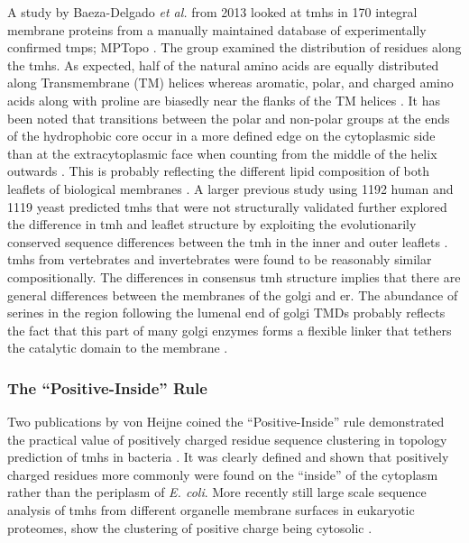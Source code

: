 A study by Baeza-Delgado {\it et al.} from 2013 \cite{Baeza-Delgado2013} looked at \gls{tmh}s in 170 integral membrane proteins from a manually maintained database of experimentally confirmed \gls{tmp}s; MPTopo \cite{Jayasinghe2001}. The group examined the distribution of residues along the \gls{tmh}s. As expected, half of the natural amino acids are equally distributed along Transmembrane (TM) helices whereas aromatic, polar, and charged amino acids along with proline are biasedly near the flanks of the TM helices \cite{Baeza-Delgado2013}. It has been noted that transitions between the polar and non-polar groups at the ends of the hydrophobic core occur in a more defined edge on the cytoplasmic side than at the extracytoplasmic face when counting from the middle of the helix outwards \cite{Baeza-Delgado2013}. This is probably reflecting the different lipid composition of both leaflets of biological membranes \cite{Baeza-Delgado2013}. A larger previous study using 1192 human and 1119 yeast predicted \gls{tmh}s that were not structurally validated further explored the difference in \gls{tmh} and leaflet structure by exploiting the evolutionarily conserved sequence differences between the \gls{tmh} in the inner and outer leaflets \cite{Sharpe2010}. \gls{tmh}s from vertebrates and invertebrates were found to be reasonably similar compositionally. The differences in consensus \gls{tmh} structure implies that there are general differences between the membranes of the golgi and \gls{er}. The abundance of serines in the region following the lumenal end of golgi TMDs probably reflects the fact that this part of many golgi enzymes forms a flexible linker that tethers the catalytic domain to the membrane \cite{Sharpe2010}.

\subsubsection{The ``Positive-Inside'' Rule}

Two publications by von Heijne coined the ``Positive-Inside'' rule demonstrated the practical value of positively charged residue sequence clustering in topology prediction of \gls{tmh}s in bacteria \cite{VonHeijne1989,VonHeijne1992}. It was clearly defined and shown that positively charged residues more commonly were found on the ``inside'' of the cytoplasm rather than the periplasm of {\it E. coli}. More recently still large scale sequence analysis of \gls{tmh}s from different organelle membrane surfaces in eukaryotic proteomes, show the clustering of positive charge being cytosolic \cite{Sharpe2010, Baeza-Delgado2013, Pogozheva2013}.

